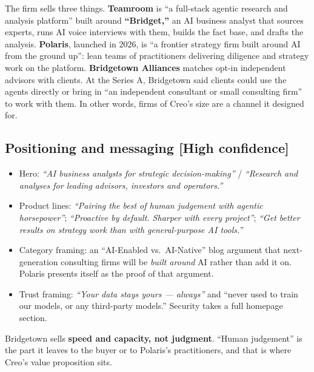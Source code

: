 \documentclass[11pt]{article}
\newcommand{\high}{\textcolor{green!45!black}{\textbf{[High confidence]}}}
\begin{document}
The firm sells three things. \textbf{Teamroom} is ``a full-stack agentic research and
analysis platform'' built around \textbf{``Bridget,''} an AI business analyst that
sources experts, runs AI voice interviews with them, builds the fact base, and drafts
the analysis. \textbf{Polaris}, launched in 2026, is ``a frontier strategy firm built
around AI from the ground up'': lean teams of practitioners delivering diligence and
strategy work on the platform. \textbf{Bridgetown Alliances} matches opt-in independent
advisors with clients. At the Series A, Bridgetown said clients could use the agents
directly or bring in ``an independent consultant or small consulting firm'' to work
with them. In other words, firms of Creo's size are a channel it designed for.

\subsection{Positioning and messaging \high}
\begin{itemize}
  \item Hero: \emph{``AI business analysts for strategic decision-making''} /
  \emph{``Research and analyses for leading advisors, investors and operators.''}
  \item Product lines: \emph{``Pairing the best of human judgement with agentic
  horsepower''}; \emph{``Proactive by default. Sharper with every project''};
  \emph{``Get better results on strategy work than with general-purpose AI tools.''}
  \item Category framing: an ``AI-Enabled vs.\ AI-Native'' blog argument that next-generation
  consulting firms will be \emph{built around} AI rather than add it on. Polaris
  presents itself as the proof of that argument.
  \item Trust framing: \emph{``Your data stays yours --- always''} and ``never used to
  train our models, or any third-party models.'' Security takes a full homepage section.
\end{itemize}
Bridgetown sells \textbf{speed and capacity, not judgment}. ``Human judgement'' is the
part it leaves to the buyer or to Polaris's practitioners, and that is where Creo's
value proposition sits.
\end{document}
